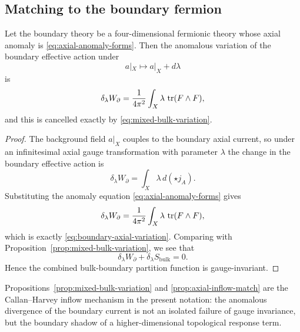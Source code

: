 \subsection{Matching to the boundary fermion}

\begin{proposition}\label{prop:axial-inflow-match}
Let the boundary theory be a four-dimensional fermionic theory whose axial anomaly is \eqref{eq:axial-anomaly-forms}. Then the anomalous variation of the boundary effective action under
\begin{equation*}
a|_X \longmapsto a|_X + d\lambda
\end{equation*}
is
\begin{equation}\label{eq:boundary-axial-variation}
\delta_\lambda W_{\partial}
=
\frac{1}{4\pi^2}\int_X \lambda\,\operatorname{tr}(F\wedge F),
\end{equation}
and this is cancelled exactly by \eqref{eq:mixed-bulk-variation}.
\end{proposition}

\begin{proof}
The background field $a|_X$ couples to the boundary axial current, so under an infinitesimal axial gauge transformation with parameter $\lambda$ the change in the boundary effective action is
\begin{equation*}
\delta_\lambda W_{\partial}
=
\int_X \lambda\,d(\star j_A).
\end{equation*}
Substituting the anomaly equation \eqref{eq:axial-anomaly-forms} gives
\begin{equation*}
\delta_\lambda W_{\partial}
=
\frac{1}{4\pi^2}\int_X \lambda\,\operatorname{tr}(F\wedge F),
\end{equation*}
which is exactly \eqref{eq:boundary-axial-variation}. Comparing with Proposition~\ref{prop:mixed-bulk-variation}, we see that
\begin{equation*}
\delta_\lambda W_{\partial}+\delta_\lambda S_{\mathrm{bulk}}=0.
\end{equation*}
Hence the combined bulk-boundary partition function is gauge-invariant.
\end{proof}

\begin{remark}\label{rem:callan-harvey-present}
Propositions~\ref{prop:mixed-bulk-variation} and \ref{prop:axial-inflow-match} are the Callan--Harvey inflow mechanism in the present notation: the anomalous divergence of the boundary current is not an isolated failure of gauge invariance, but the boundary shadow of a higher-dimensional topological response term.
\end{remark}

